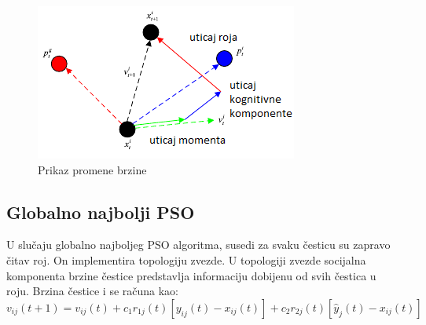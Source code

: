 \documentclass[a4paper]{article}
\begin{document}
\begin{figure}[htp]
    \centering
    \includegraphics{velocity.png}
    \caption{Prikaz promene brzine}
    \label{fig:velocity}
\end{figure}


\subsection{Globalno najbolji PSO}
\label{subsec:podnaslov1}

U slučaju globalno najboljeg PSO algoritma, susedi za svaku česticu su zapravo čitav roj. On implementira topologiju zvezde. U topologiji zvezde socijalna komponenta brzine čestice predstavlja informaciju dobijenu od svih čestica u roju. 
Brzina čestice i se računa kao:
\[v_{ij}(t + 1) = v_{ij}(t) + c_1r_{1j}(t)[y_{ij}(t) - x_{ij}(t)] + c_2r_{2j}(t)[\hat{y}_j(t) - x_{ij}(t)] \]
\end{document}
